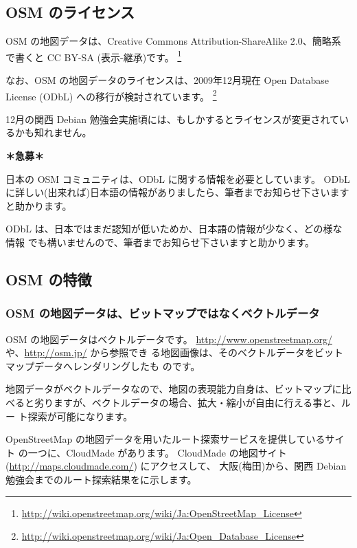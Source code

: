 \documentclass[mingoth,a4paper]{jsarticle}
\begin{document}
\subsection{OSM のライセンス}

OSM の地図データは、Creative Commons Attribution-ShareAlike 2.0、簡略系
で書くと CC BY-SA (表示-継承)です。
\footnote{\url{http://wiki.openstreetmap.org/wiki/Ja:OpenStreetMap_License}}

なお、OSM の地図データのライセンスは、2009年12月現在 Open Database License (ODbL) への移行が検討されています。
\footnote{\url{http://wiki.openstreetmap.org/wiki/Ja:Open_Database_License}}

12月の関西 Debian 勉強会実施頃には、もしかするとライセンスが変更されているかも知れません。

\textbf{{\large ＊急募＊} }

日本の OSM コミュニティは、ODbL に関する情報を必要としています。
ODbL に詳しい(出来れば)日本語の情報がありましたら、筆者までお知らせ下さいますと助かります。

ODbL は、日本ではまだ認知が低いためか、日本語の情報が少なく、どの様な情報
でも構いませんので、筆者までお知らせ下さいますと助かります。

\subsection{OSM の特徴}

\subsubsection{OSM の地図データは、ビットマップではなくベクトルデータ}

OSM の地図データはベクトルデータです。
\url{http://www.openstreetmap.org/} や、\url{http://osm.jp/} から参照でき
る地図画像は、そのベクトルデータをビットマップデータへレンダリングしたも
のです。

地図データがベクトルデータなので、地図の表現能力自身は、ビットマップに比
べると劣りますが、ベクトルデータの場合、拡大・縮小が自由に行える事と、ルー
ト探索が可能になります。

OpenStreetMap の地図データを用いたルート探索サービスを提供しているサイト
の一つに、CloudMade があります。
CloudMade の地図サイト (\url{http://maps.cloudmade.com/}) にアクセスして、
大阪(梅田)から、関西 Debian 勉強会までのルート探索結果をに示します。
\end{document}
